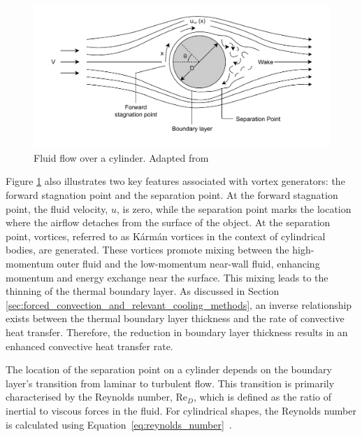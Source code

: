 \begin{figure}[H]
    \centering
    \includegraphics[width=1\linewidth,  trim=0 10 0 10, clip]{Figures/vortex_generator.pdf}
    \caption{Fluid flow over a cylinder. Adapted from \cite{VanTreuren2015ABSTRACTTurbines}}
    \label{fig:vortex_generator}
\end{figure}

Figure \ref{fig:vortex_generator} also illustrates two key features associated with vortex generators: the forward stagnation point and the separation point. At the forward stagnation point, the fluid velocity, $u$, is zero, while the separation point marks the location where the airflow detaches from the surface of the object. At the separation point, vortices, referred to as Kármán vortices in the context of cylindrical bodies, are generated. \cite{Wille1960KarmanStreets} These vortices promote mixing between the high-momentum outer fluid and the low-momentum near-wall fluid, enhancing momentum and energy exchange near the surface. This mixing leads to the thinning of the thermal boundary layer. As discussed in Section \ref{sec:forced_convection_and_relevant_cooling_methods}, an inverse relationship exists between the thermal boundary layer thickness and the rate of convective heat transfer. Therefore, the reduction in boundary layer thickness results in an enhanced convective heat transfer rate.

The location of the separation point on a cylinder depends on the boundary layer’s transition from laminar to turbulent flow. This transition is primarily characterised by the Reynolds number, \(\text{Re}_D\), which is defined as the ratio of inertial to viscous forces in the fluid. For cylindrical shapes, the Reynolds number is calculated using Equation~\ref{eq:reynolds_number}~\cite{Cengel2014ExternalConvection}.

